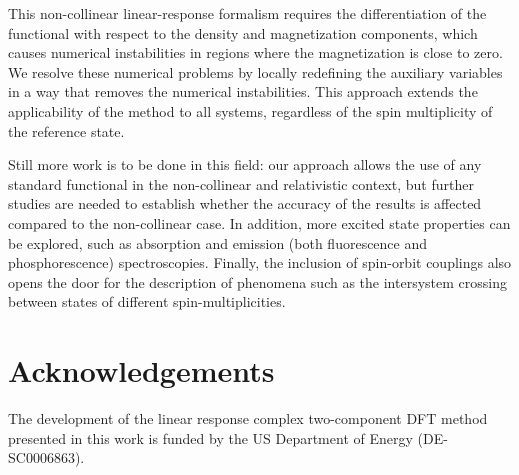 \documentclass[12pt]{article}
\begin{document}
This non-collinear linear-response formalism requires the differentiation of the functional with respect to the density and magnetization components, which causes numerical instabilities in regions where the magnetization is close to zero.
We resolve these numerical problems by locally redefining the auxiliary variables in a way that removes the numerical instabilities.
This approach extends the applicability of the method to all systems, regardless of the spin multiplicity of the reference state.

Still more work is to be done in this field: our approach allows the use of any standard functional in the non-collinear and relativistic context, but further studies are needed to establish whether the accuracy of the results is affected compared to the non-collinear case.
In addition, more excited state properties can be explored, such as absorption and emission (both fluorescence and phosphorescence) spectroscopies.
Finally, the inclusion of spin-orbit couplings also opens the door for the description of phenomena such as the intersystem crossing between states of different spin-multiplicities.


\section{Acknowledgements}
The development of the linear response complex two-component DFT method presented in this work is funded by the US Department of Energy (DE-SC0006863).


\newpage


\end{document}
